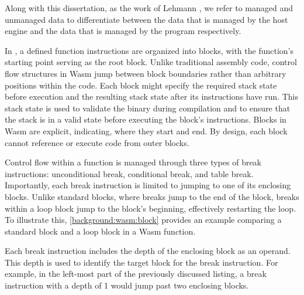 \begin{definition}\label{managed_unmanaged}
    Along with this dissertation, as the work of Lehmann \etal \cite{usenixWasm2020}, we refer to managed and unmanaged data to differentiate between the data that is managed by the host engine and the data that is managed by the \Wasm program respectively. 
\end{definition}



In \Wasm, a defined function instructions are organized into blocks, with the function's starting point serving as the root block. 
Unlike traditional assembly code, control flow structures in Wasm jump between block boundaries rather than arbitrary positions within the code. 
Each block might specify the required stack state before execution and the resulting stack state after its instructions have run. 
This stack state is used to validate the binary during compilation and to ensure that the stack is in a valid state before executing the block's instructions.
Blocks in Wasm are explicit, indicating, where they start and end.
By design, each block cannot reference or execute code from outer blocks.

Control flow within a function is managed through three types of break instructions: unconditional break, conditional break, and table break. 
Importantly, each break instruction is limited to jumping to one of its enclosing blocks.
Unlike standard blocks, where breaks jump to the end of the block, breaks within a loop block jump to the block's beginning, effectively restarting the loop. 
To illustrate this, \autoref{background:wasm:block} provides an example comparing a standard block and a loop block in a Wasm function.



Each break instruction includes the depth of the enclosing block as an operand. 
This depth is used to identify the target block for the break instruction. 
For example, in the left-most part of the previously discussed listing, a break instruction with a depth of 1 would jump past two enclosing blocks.


\label{background:wasm:ecosystems}


